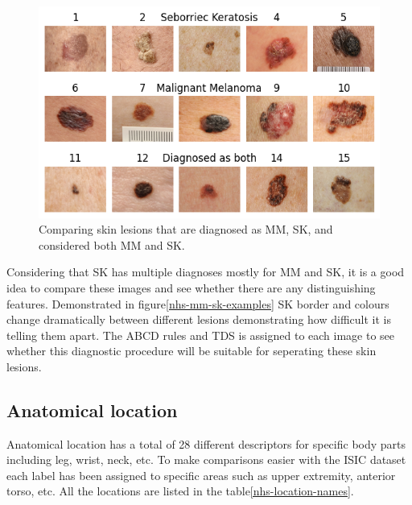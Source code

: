\begin{figure}
	\centering
	\includegraphics[scale=0.75]{images/nhs/nhs-mm-sk-examples.png}
	\caption{Comparing skin lesions that are diagnosed as MM, SK, and considered both MM and SK.}
\end{figure}\label{nhs-mm-sk-examples}

Considering that SK has multiple diagnoses mostly for MM and SK, it is a good idea to compare these images and see whether there are any distinguishing features. Demonstrated in figure\ref{nhs-mm-sk-examples} SK border and colours change dramatically between different lesions demonstrating how difficult it is telling them apart\cite{}. The ABCD rules and TDS is assigned to each image to see whether this diagnostic procedure will be suitable for seperating these skin lesions.

\subsection{Anatomical location}

Anatomical location has a total of 28 different descriptors for specific body parts including leg, wrist, neck, etc. To make comparisons easier with the ISIC dataset each label has been assigned to specific areas such as upper extremity, anterior torso, etc. All the locations are listed in the table\ref{nhs-location-names}.


